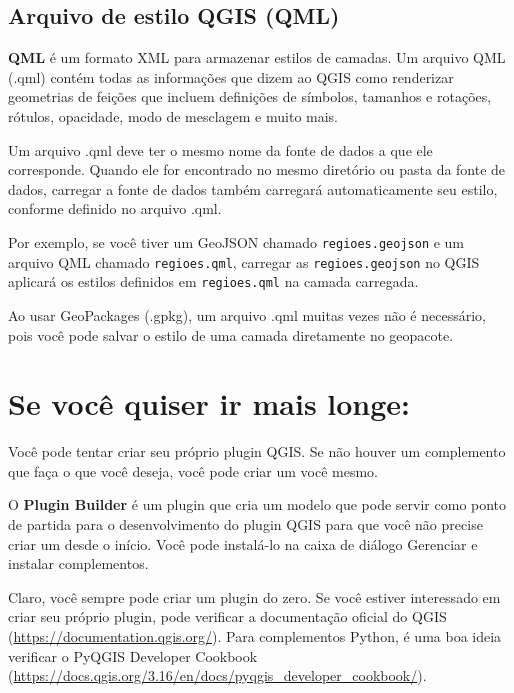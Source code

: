 \documentclass[
  portuguese,
]{krantz}
\begin{document}
\hypertarget{arquivo-de-estilo-qgis-qml}{%
\subsection{\texorpdfstring{\textbf{Arquivo de estilo QGIS (QML)}}{Arquivo de estilo QGIS (QML)}}\label{arquivo-de-estilo-qgis-qml}}

\textbf{QML} é um formato XML para armazenar estilos de camadas. Um arquivo QML (.qml) contém todas as informações que dizem ao QGIS como renderizar geometrias de feições que incluem definições de símbolos, tamanhos e rotações, rótulos, opacidade, modo de mesclagem e muito mais.

Um arquivo .qml deve ter o mesmo nome da fonte de dados a que ele corresponde. Quando ele for encontrado no mesmo diretório ou pasta da fonte de dados, carregar a fonte de dados também carregará automaticamente seu estilo, conforme definido no arquivo .qml.

Por exemplo, se você tiver um GeoJSON chamado \texttt{regioes.geojson} e um arquivo QML chamado \texttt{regioes.qml}, carregar as \texttt{regioes.geojson} no QGIS aplicará os estilos definidos em \texttt{regioes.qml} na camada carregada.

Ao usar GeoPackages (.gpkg), um arquivo .qml muitas vezes não é necessário, pois você pode salvar o estilo de uma camada diretamente no geopacote.

\hypertarget{se-vocuxea-quiser-ir-mais-longe-1}{%
\section{Se você quiser ir mais longe:}\label{se-vocuxea-quiser-ir-mais-longe-1}}

Você pode tentar criar seu próprio plugin QGIS. Se não houver um complemento que faça o que você deseja, você pode criar um você mesmo.

O \textbf{Plugin Builder} é um plugin que cria um modelo que pode servir como ponto de partida para o desenvolvimento do plugin QGIS para que você não precise criar um desde o início. Você pode instalá-lo na caixa de diálogo Gerenciar e instalar complementos.

Claro, você sempre pode criar um plugin do zero. Se você estiver interessado em criar seu próprio plugin, pode verificar a documentação oficial do QGIS (\url{https://documentation.qgis.org/}). Para complementos Python, é uma boa ideia verificar o PyQGIS Developer Cookbook (\href{https://docs.qgis.org/3.16/en/docs/pyqgis_developer_cookbook\%20/}{https://docs.qgis.org/3.16/en/docs/pyqgis\_developer\_cookbook/}).
\end{document}
